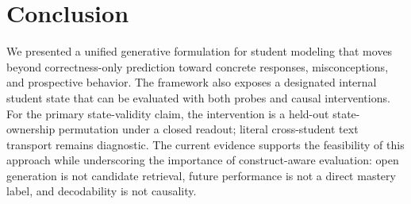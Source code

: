 \section{Conclusion}
\label{sec:conclusion}


We presented a unified generative formulation for student modeling that moves
beyond correctness-only prediction toward concrete responses, misconceptions,
and prospective behavior.  The framework also exposes a designated internal
student state that can be evaluated with both probes and causal interventions.
For the primary state-validity claim, the intervention is a held-out
state-ownership permutation under a closed readout; literal cross-student text
transport remains diagnostic.
The current evidence supports the feasibility of this approach while
underscoring the importance of construct-aware evaluation: open generation is
not candidate retrieval, future performance is not a direct mastery label, and
decodability is not causality.
